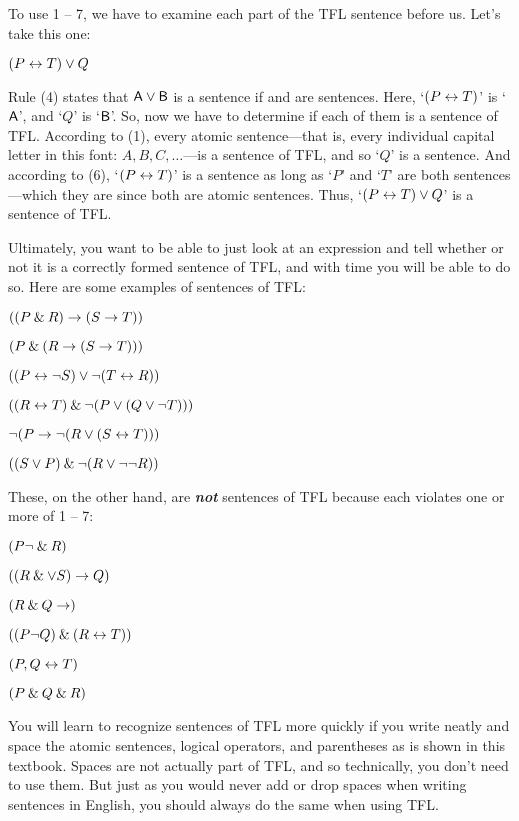 To use 1 -- 7, we have to examine each part of the TFL sentence before us. Let's take this one:

\begin{earg}
\item[] $(P \leftrightarrow T) \vee Q$
\end{earg}

\noindent Rule (4) states that $\mathsf{A} \vee \mathsf{B}$ is a sentence if  and  are sentences. Here, `$(P \leftrightarrow T)$' is `$\mathsf{A}$', and `$Q$' is `$\mathsf{B}$'. So, now we have to determine if each of them is a sentence of TFL. According to (1), every atomic sentence---that is, every individual capital letter in this font: $A, B, C, \ldots$---is a sentence of TFL, and so `$Q$' is a sentence. And according to (6), `$(P \leftrightarrow T)$' is a sentence as long as `$P$' and `$T$' are both sentences---which they are since both are atomic sentences. Thus, `$(P \leftrightarrow T) \vee Q$' is a sentence of TFL. 

Ultimately, you want to be able to just look at an expression and tell whether or not it is a correctly formed sentence of TFL, and with time you will be able to do so. Here are some examples of sentences of TFL:
\begin{earg}
\item $((P \mathbin{\&} R) \rightarrow (S \rightarrow T))$
\item $(P \mathbin{\&} (R \rightarrow (S \rightarrow T)))$
\item $((P \leftrightarrow {\neg} S) \vee {\neg}(T \leftrightarrow R))$
\item $((R \leftrightarrow T) \mathbin{\&} {\neg}(P \vee (Q \vee {\neg} T)))$
\item ${\neg}(P \rightarrow {\neg}(R \vee (S \leftrightarrow T)))$
\item $((S \vee P) \mathbin{\&} {\neg}(R \vee {\neg}{\neg} R))$
\end{earg}
These, on the other hand, are \textit{\textbf{not}} sentences of TFL because each violates one or more of 1 -- 7:
\begin{earg}
\item $(P{\neg} \mathbin{\&} R)$
\item $((R \mathbin{\&} \vee S) \rightarrow Q)$
\item $(R \mathbin{\&} Q \rightarrow)$
\item $((P {\neg} Q) \mathbin{\&} (R \leftrightarrow T))$
\item $(P,Q \leftrightarrow T)$
\item $(P \mathbin{\&} Q \mathbin{\&} R)$
\end{earg}

You will learn to recognize sentences of TFL more quickly if you write neatly and space the atomic sentences, logical operators, and parentheses as is shown in this textbook. Spaces are not actually part of TFL, and so technically, you don't need to use them. But just as you would never add or drop spaces when writing sentences in English, you should always do the same when using TFL.


